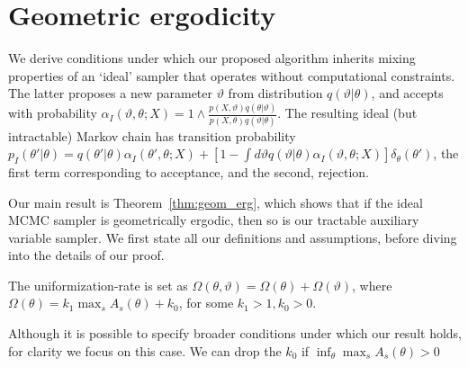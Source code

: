 \section{Geometric ergodicity}
We derive conditions under which our proposed algorithm
inherits mixing properties of an `ideal' sampler that operates without
computational constraints. The latter proposes a new parameter $\vartheta$
from distribution $q(\vartheta|\theta)$, and accepts with probability
$\alpha_I(\vartheta,\theta; X) = 1 \wedge \frac{p(X , \vartheta)q(\theta| \vartheta)}
{p(X , \theta)q(\vartheta|\theta)}$.  The resulting ideal (but intractable)
Markov chain has transition probability
$p_I(\theta'|\theta) = q(\theta'|\theta)\alpha_I(\theta',\theta;X) + \left[1-\int d\vartheta
q(\vartheta|\theta)\alpha_I(\vartheta,\theta;X)\right]\delta_\theta(\theta')$, the first
term corresponding to acceptance, and the second, rejection.

Our main result is Theorem~\ref{thm:geom_erg}, which shows that if the ideal MCMC
sampler is geometrically ergodic, then so is our tractable auxiliary
variable sampler. 
We first state all our definitions and assumptions, before diving into the details
of our proof.
\begin{assumption}
The uniformization-rate is set as $\Omega(\theta, \vartheta) = \Omega(\theta) + 
\Omega(\vartheta)$, where %
$\Omega(\theta) = k_1 \max_s A_{s}(\theta) + k_0$, for some 
$k_1 > 1, k_0 > 0$.
\label{asmp:unif_rate}
\end{assumption}
Although it is possible to specify broader conditions under which our 
result holds, for clarity we focus on this case. 
We can drop the $k_0$ if $\inf_\theta \max_s A_s(\theta) > 0$

